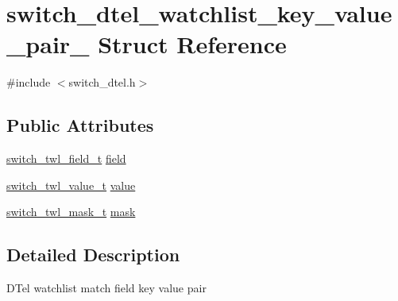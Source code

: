 \hypertarget{structswitch__dtel__watchlist__key__value__pair__}{\section{switch\+\_\+dtel\+\_\+watchlist\+\_\+key\+\_\+value\+\_\+pair\+\_\+ Struct Reference}
\label{structswitch__dtel__watchlist__key__value__pair__}
}


{\ttfamily \#include $<$switch\+\_\+dtel.\+h$>$}

\subsection*{Public Attributes}
\begin{DoxyCompactItemize}
\item 
\hyperlink{group__DTel_gabf1727b3b95e347527f21edc4d190da3}{switch\+\_\+twl\+\_\+field\+\_\+t} \hyperlink{structswitch__dtel__watchlist__key__value__pair___a4ec05f57ff36f1695f514508e28b813d}{field}
\item 
\hyperlink{group__DTel_ga7a0ef1d328d3dff99e1d4ad961691b78}{switch\+\_\+twl\+\_\+value\+\_\+t} \hyperlink{structswitch__dtel__watchlist__key__value__pair___a2c8704e498f58182e775905d53c06c2f}{value}
\item 
\hyperlink{group__DTel_ga2d24f83795fcb9f29c85153777c47d8f}{switch\+\_\+twl\+\_\+mask\+\_\+t} \hyperlink{structswitch__dtel__watchlist__key__value__pair___a33dc1da79e1161623ea071b1dbeceadd}{mask}
\end{DoxyCompactItemize}


\subsection{Detailed Description}
D\+Tel watchlist match field key value pair 

